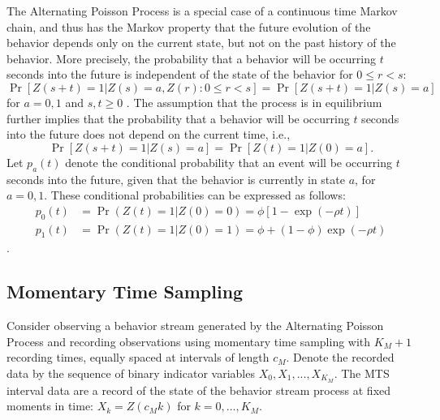 \documentclass[man, noextraspace, floatsintext]{apa6}\usepackage[]{graphicx}\usepackage[]{color}
\begin{document}
The Alternating Poisson Process is a special case of a continuous time Markov chain, and thus has the Markov property that the future evolution of the behavior depends only on the current state, but not on the past history of the behavior. 
More precisely, the probability that a behavior will be occurring $t$ seconds into the future is independent of the state of the behavior for $0 \leq r < s$: 
\begin{equation}
\label{eq:Markov}
\Pr\left[Z(s + t) = 1 \left| Z(s) = a, Z(r): 0 \leq r < s \right.\right] = \Pr\left[ Z(s + t) = 1 \left| Z(s) = a \right.\right]
\end{equation}
for $a = 0,1$ and $s,t \geq 0$ \citep[Thm. 6.1]{Kulkarni2010modeling}. 
The assumption that the process is in equilibrium further implies that the probability that a behavior will be occurring $t$ seconds into the future does not depend on the current time, i.e.,  
\begin{equation}
\label{eq:equilibrium}
\Pr\left[Z(s + t) = 1 \left| Z(s) = a\right.\right] = \Pr\left[ Z(t) = 1 \left| Z(0) = a \right.\right].
\end{equation}
Let $p_a(t)$ denote the conditional probability that an event will be occurring $t$ seconds into the future, given that the behavior is currently in state $a$, for $a = 0,1$. 
These conditional probabilities can be expressed as follows:
\begin{equation}
\begin{aligned}
p_0(t) &= \Pr(Z(t) = 1 | Z(0) = 0) = \phi \left[1 - \exp\left(-\rho t\right)\right] \\
p_1(t) &= \Pr(Z(t) = 1 | Z(0) = 1) = \phi + (1 - \phi) \exp\left(-\rho t\right)
\end{aligned}
\end{equation}
\citep[Eq. 6.17]{Kulkarni2010modeling}.

\subsection{Momentary Time Sampling}
\label{subsec:MTS}

Consider observing a behavior stream generated by the Alternating Poisson Process and recording observations using momentary time sampling with $K_M + 1$ recording times, equally spaced at intervals of length $c_M$. 
Denote the recorded data by the sequence of binary indicator variables $X_0,X_1,...,X_{K_M}$. The MTS interval data are a record of the state of the behavior stream process at fixed moments in time: $X_k = Z(c_M k)$ for $k = 0,...,K_M$. 
\end{document}

